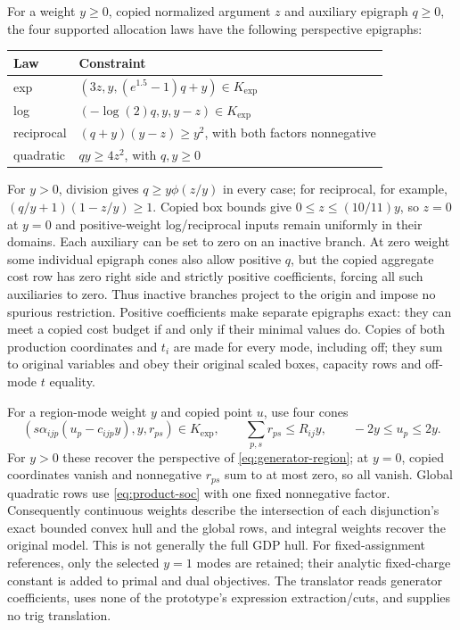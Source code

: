 For a weight $y\ge0$, copied normalized argument $z$ and auxiliary epigraph $q\ge0$, the four supported allocation laws have the following perspective epigraphs:
\begin{center}\small
\begin{tabular}{ll}\toprule
Law & Constraint\\\midrule
exp & $(3z,y,(e^{1.5}-1)q+y)\in K_{\exp}$\\
log & $(-\log(2)q,y,y-z)\in K_{\exp}$\\
reciprocal & $(q+y)(y-z)\ge y^2$, with both factors nonnegative\\
quadratic & $qy\ge4z^2$, with $q,y\ge0$\\\bottomrule
\end{tabular}\end{center}
For $y>0$, division gives $q\ge y\phi(z/y)$ in every case; for reciprocal, for example, $(q/y+1)(1-z/y)\ge1$. Copied box bounds give $0\le z\le(10/11)y$, so $z=0$ at $y=0$ and positive-weight log/reciprocal inputs remain uniformly in their domains. Each auxiliary can be set to zero on an inactive branch. At zero weight some individual epigraph cones also allow positive $q$, but the copied aggregate cost row has zero right side and strictly positive coefficients, forcing all such auxiliaries to zero. Thus inactive branches project to the origin and impose no spurious restriction. Positive coefficients make separate epigraphs exact: they can meet a copied cost budget if and only if their minimal values do. Copies of both production coordinates and $t_i$ are made for every mode, including off; they sum to original variables and obey their original scaled boxes, capacity rows and off-mode $t$ equality.

For a region-mode weight $y$ and copied point $u$, use four cones
\[
 (s\alpha_{ijp}(u_p-c_{ijp}y),y,r_{ps})\in K_{\exp},
 \qquad \sum_{p,s}r_{ps}\le R_{ij}y,
 \qquad -2y\le u_p\le2y.
\]
For $y>0$ these recover the perspective of \eqref{eq:generator-region}; at $y=0$, copied coordinates vanish and nonnegative $r_{ps}$ sum to at most zero, so all vanish. Global quadratic rows use \eqref{eq:product-soc} with one fixed nonnegative factor. Consequently continuous weights describe the intersection of each disjunction's exact bounded convex hull and the global rows, and integral weights recover the original model. This is not generally the full GDP hull. For fixed-assignment references, only the selected $y=1$ modes are retained; their analytic fixed-charge constant is added to primal and dual objectives. The translator reads generator coefficients, uses none of the prototype's expression extraction/cuts, and supplies no trig translation.

